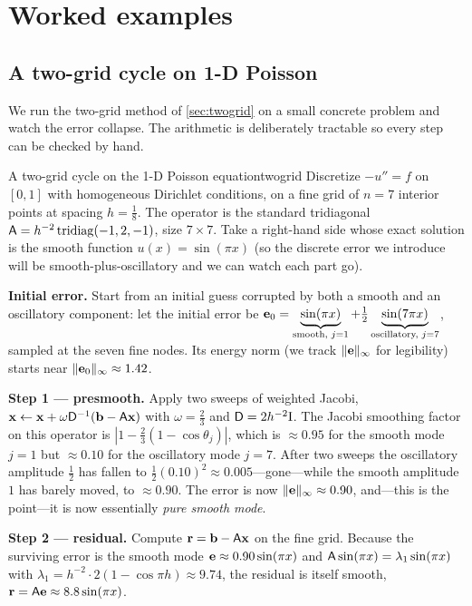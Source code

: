 \section{Worked examples}

\subsection{A two-grid cycle on 1-D Poisson}

We run the two-grid method of \cref{sec:twogrid} on a small concrete problem and watch the
error collapse. The arithmetic is deliberately tractable so every step can be checked by
hand.

\begin{workedexample}{A two-grid cycle on the 1-D Poisson equation}{twogrid}
Discretize $-u'' = f$ on $[0,1]$ with homogeneous Dirichlet conditions, on a fine grid of
$n=7$ interior points at spacing $h=\tfrac18$. The operator is the standard tridiagonal
$\mathsf{A} = h^{-2}\,\mathrm{tridiag}(-1, 2, -1)$, size $7\times 7$. Take a right-hand side
whose exact solution is the smooth function $u(x)=\sin(\pi x)$ (so the discrete error we
introduce will be smooth-plus-oscillatory and we can watch each part go).

\textbf{Initial error.} Start from an initial guess corrupted by both a smooth and an
oscillatory component: let the initial error be
$\mathbf{e}_0 = \underbrace{\sin(\pi x)}_{\text{smooth, } j=1} +
\tfrac12\underbrace{\sin(7\pi x)}_{\text{oscillatory, } j=7}$,
sampled at the seven fine nodes. Its energy norm (we track $\lVert\mathbf{e}\rVert_\infty$ for
legibility) starts near $\lVert\mathbf{e}_0\rVert_\infty \approx 1.42$.

\textbf{Step 1 --- presmooth.} Apply two sweeps of weighted Jacobi, $\mathbf{x} \leftarrow \mathbf{x} +
\omega\mathsf{D}^{-1}(\mathbf{b}-\mathsf{A}\mathbf{x})$ with $\omega=\tfrac23$ and $\mathsf{D}=2h^{-2}\mathrm{I}$.
The Jacobi smoothing factor on this operator is $|1-\tfrac23(1-\cos\theta_j)|$, which is
$\approx 0.95$ for the smooth mode $j=1$ but $\approx 0.10$ for the oscillatory mode $j=7$.
After two sweeps the oscillatory amplitude $\tfrac12$ has fallen to
$\tfrac12(0.10)^2 \approx 0.005$---gone---while the smooth amplitude $1$ has barely
moved, to $\approx 0.90$. The error is now $\lVert\mathbf{e}\rVert_\infty \approx 0.90$, and---this is
the point---it is now essentially \emph{pure smooth mode}.

\textbf{Step 2 --- residual.} Compute $\mathbf{r} = \mathbf{b} - \mathsf{A}\mathbf{x}$ on the fine grid. Because the
surviving error is the smooth mode $\mathbf{e}\approx 0.90\sin(\pi x)$ and $\mathsf{A}\sin(\pi x) =
\lambda_1\sin(\pi x)$ with $\lambda_1 = h^{-2}\cdot 2(1-\cos\pi h)\approx 9.74$, the residual
is itself smooth, $\mathbf{r} = \mathsf{A}\mathbf{e} \approx 8.8\sin(\pi x)$.


\end{workedexample}
